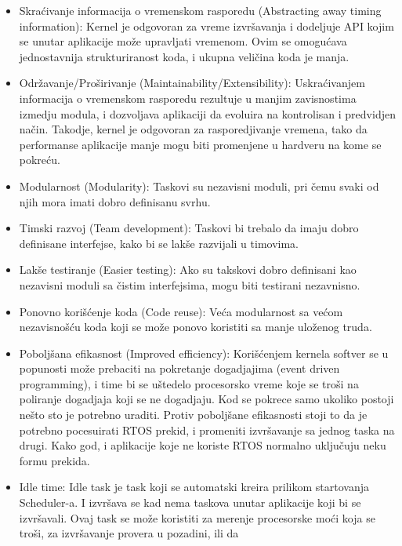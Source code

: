 \documentclass[a4paper,12pt, master]{etf}
\begin{document}
	\begin{itemize}
		\item Skra\'{c}ivanje informacija o vremenskom rasporedu (Abstracting away timing information): 
		Kernel je odgovoran za vreme izvr\v{s}avanja i dodeljuje API kojim se 
		unutar aplikacije mo\v{z}e upravljati vremenom. Ovim se omogu\'{c}ava jednostavnija 
		strukturiranost koda, i ukupna veli\v{c}ina koda je manja.
		\item Odr\v{z}avanje/Pro\v{s}irivanje (Maintainability/Extensibility):
		Uskra\'{c}ivanjem informacija o vremenskom rasporedu rezultuje u manjim zavisnostima 
		izmedju	modula, i dozvoljava aplikaciji da evoluira na kontrolisan i predvidjen 
		na\v{c}in. Takodje, kernel je odgovoran za rasporedjivanje vremena, tako da performanse 
		aplikacije manje mogu biti promenjene u hardveru na kome se pokre\'{c}u.
		\item Modularnost (Modularity):
		Taskovi su nezavisni moduli, pri \v{c}emu svaki od njih mora imati dobro definisanu svrhu.
		\item Timski razvoj (Team development):
		Taskovi bi trebalo da imaju dobro definisane interfejse, kako bi se lak\v{s}e razvijali u
		timovima.
		\item Lak\v{s}e testiranje (Easier testing):
		Ako su takskovi dobro definisani kao nezavisni moduli sa \v{c}istim interfejsima, mogu biti
		testirani nezavnisno.
		\item Ponovno kori\v{s}\'{c}enje koda (Code reuse):
		Ve\'{c}a modularnost sa ve\'{c}om nezavisno\v{s}\'{c}u koda koji se mo\v{z}e ponovo koristiti 
		sa manje ulo\v{z}enog truda.
		\item Pobolj\v{s}ana efikasnost (Improved efficiency):
		Kori\v{s}\'{c}enjem kernela softver se u popunosti mo\v{z}e prebaciti na pokretanje dogadjajima 
		(event driven programming), i time bi se u\v{s}tedelo procesorsko vreme koje se tro\v{s}i na 
		poliranje dogadjaja koji se ne dogadjaju. Kod se pokrece samo ukoliko postoji ne\v{s}to 
		sto je potrebno	uraditi. Protiv pobolj\v{s}ane efikasnosti stoji to da je potrebno pocesuirati 
		RTOS prekid, i promeniti izvr\v{s}avanje sa jednog taska na drugi. Kako god, i aplikacije koje ne 
		koriste RTOS normalno uklju\v{c}uju neku formu prekida.
		\item Idle time:
		Idle task je task koji se automatski kreira prilikom startovanja Scheduler-a. I izvr\v{s}ava se 
		kad nema taskova unutar aplikacije koji bi se izvr\v{s}avali. Ovaj task se mo\v{z}e koristiti za 
		merenje procesorske mo\'{c}i koja se tro\v{s}i, za izvr\v{s}avanje provera u pozadini, ili da 

\end{itemize}
\end{document}
